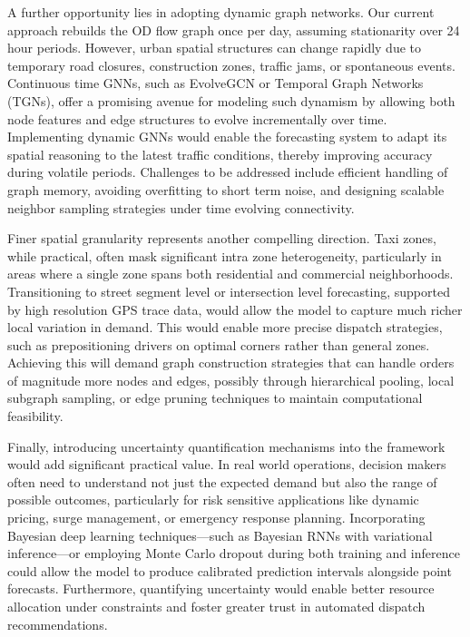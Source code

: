 \documentclass{article}
\begin{document}
A further opportunity lies in adopting dynamic graph networks. Our current approach rebuilds the OD flow graph once per day, assuming stationarity over 24 hour periods. However, urban spatial structures can change rapidly due to temporary road closures, construction zones, traffic jams, or spontaneous events. Continuous time GNNs, such as EvolveGCN or Temporal Graph Networks (TGNs), offer a promising avenue for modeling such dynamism by allowing both node features and edge structures to evolve incrementally over time. Implementing dynamic GNNs would enable the forecasting system to adapt its spatial reasoning to the latest traffic conditions, thereby improving accuracy during volatile periods. Challenges to be addressed include efficient handling of graph memory, avoiding overfitting to short term noise, and designing scalable neighbor sampling strategies under time evolving connectivity.

Finer spatial granularity represents another compelling direction. Taxi zones, while practical, often mask significant intra zone heterogeneity, particularly in areas where a single zone spans both residential and commercial neighborhoods. Transitioning to street segment level or intersection level forecasting, supported by high resolution GPS trace data, would allow the model to capture much richer local variation in demand. This would enable more precise dispatch strategies, such as prepositioning drivers on optimal corners rather than general zones. Achieving this will demand graph construction strategies that can handle orders of magnitude more nodes and edges, possibly through hierarchical pooling, local subgraph sampling, or edge pruning techniques to maintain computational feasibility.

Finally, introducing uncertainty quantification mechanisms into the framework would add significant practical value. In real world operations, decision makers often need to understand not just the expected demand but also the range of possible outcomes, particularly for risk sensitive applications like dynamic pricing, surge management, or emergency response planning. Incorporating Bayesian deep learning techniques—such as Bayesian RNNs with variational inference—or employing Monte Carlo dropout during both training and inference could allow the model to produce calibrated prediction intervals alongside point forecasts. Furthermore, quantifying uncertainty would enable better resource allocation under constraints and foster greater trust in automated dispatch recommendations.
\end{document}
